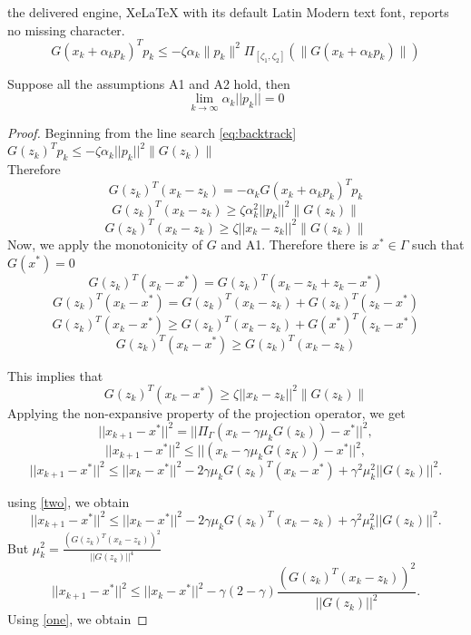 \documentclass[10pt,a4paper]{amsart}
\begin{document}
the delivered engine, XeLaTeX with its default Latin Modern text font, reports no missing character.
            \begin{equation}
                G(x_k + \alpha_k p_k)^T p_k \leq -\zeta \alpha_k \| p_k \|^2 \Pi_{[\zeta_1, \zeta_2]}(\|G(x_k + \alpha_k p_k)\|)
                \label{eq:backtrack}
            \end{equation}

\begin{lemma}
\label{lemmA1}
    Suppose all the assumptions A1 and A2 hold, then \[\lim_{k\rightarrow \infty}\alpha_k||p_k||=0\]
\end{lemma}

\begin{proof}
    Beginning from the line search \eqref{eq:backtrack} $ G(z_k)^Tp_k\leq -\zeta \alpha_k||p_k||^2 \|G(z_k)\|$\\ Therefore 
    \[
    G(z_k)^T(x_k-z_k)=-\alpha_kG(x_k+\alpha_kp_k)^Tp_k
    \]
    \[
    G(z_k)^T(x_k-z_k)\geq \zeta \alpha_k^2||p_k||^2\|G(z_k)\|
    \]
     \begin{equation}\label{one}
         G(z_k)^T(x_k-z_k)\geq \zeta ||x_k-z_k||^2\|G(z_k)\|
     \end{equation}
 Now, we apply the monotonicity of $G$ and A1. Therefore there is $x^*\in \Gamma$ such that $G(x^*)=0$ \\
    \[
    G(z_k)^T(x_k-x^*)=G(z_k)^T(x_k-z_k+z_k-x^*)
    \]
    \[
    G(z_k)^T(x_k-x^*)=G(z_k)^T(x_k-z_k)+G(z_k)^T(z_k-x^*)
    \]
    \[
    G(z_k)^T(x_k-x^*)\geq G(z_k)^T(x_k-z_k)+G(x^*)^T(z_k-x^*)
    \]
     \begin{equation}\label{two}
          G(z_k)^T(x_k-x^*)\geq G(z_k)^T(x_k-z_k)
     \end{equation}
    
    This implies that
    \begin{equation}\label{three}
       G(z_k)^T(x_k-x^*)\geq \zeta ||x_k-z_k||^2 \|G(z_k)\|
    \end{equation}
    Applying the non-expansive property of the projection operator, we get
    \[
   || x_{k+1}-x^*||^2=||\Pi_{\Gamma}(x_k- \gamma\mu_kG(z_k))-x^*||^2,
    \]
    \[
   || x_{k+1}-x^*||^2\leq ||(x_k- \gamma\mu_kG(z_K))-x^*||^2,
    \]
     \[
   || x_{k+1}-x^*||^2\leq ||x_k-x^*||^2-2 \gamma\mu_kG(z_k)^T(x_k-x^*)+\gamma^2\mu_k^2||G(z_k)||^2.
    \]
   
    using \eqref{two}, we obtain
     \[
         || x_{k+1}-x^*||^2\leq ||x_k-x^*||^2- 2\gamma\mu_kG(z_k)^T(x_k-z_k)+\gamma^2\mu_k^2||G(z_k)||^2.
     \]
     But $\mu_k^2=\frac{(G(z_k)^T(x_k-z_k))^2}{||G(z_k)||^4}$
   \[
         || x_{k+1}-x^*||^2\leq ||x_k-x^*||^2- \gamma(2-\gamma)\frac{(G(z_k)^T(x_k-z_k))^2}{||G(z_k)||^2}.
     \]
     Using \eqref{one}, we obtain 
    

\end{proof}
\end{document}
